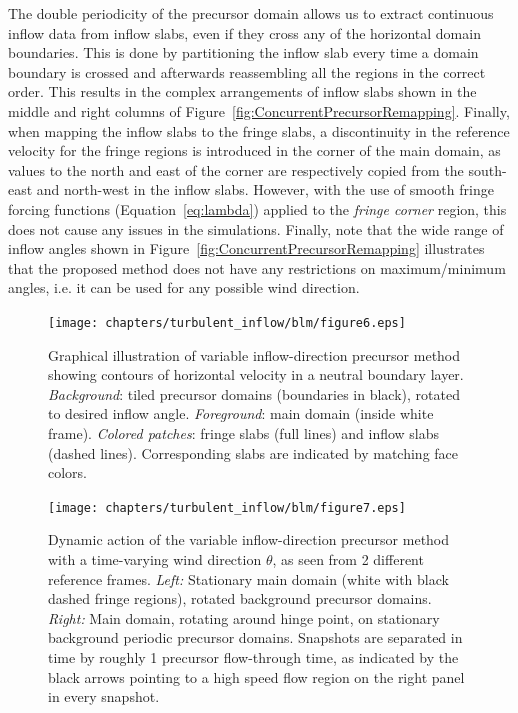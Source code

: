 	The double periodicity of the precursor domain allows us to extract continuous inflow data from inflow slabs, even if they cross any of the horizontal domain boundaries. This is done by partitioning the inflow slab every time a domain boundary is crossed and afterwards reassembling all the regions in the correct order. This results in the complex arrangements of inflow slabs shown in the middle and right columns of Figure~\ref{fig:ConcurrentPrecursorRemapping}.
	Finally, when mapping the inflow slabs to the fringe slabs, a discontinuity in the reference velocity for the fringe regions is introduced in the corner of the main domain, as values to the north and east of the corner are respectively copied from the south-east and north-west in the inflow slabs. However, with  the use of smooth fringe forcing functions (Equation~\ref{eq:lambda}) applied to the \emph{fringe corner} region, this does not cause any issues in the simulations. Finally, note that the wide range of inflow angles shown in Figure~\ref{fig:ConcurrentPrecursorRemapping} illustrates that the proposed method does not have any restrictions on maximum/minimum angles, i.e. it can be used for any possible wind direction.
	
	\begin{figure}[ht!]
		\centering
		\texttt{[image: chapters/turbulent\_inflow/blm/figure6.eps]}
		\caption[Graphical illustration of variable inflow-direction precursor method showing contours of horizontal velocity in a neutral boundary layer.]{Graphical illustration of variable inflow-direction precursor method showing contours of horizontal velocity in a neutral boundary layer. \emph{Background}: tiled precursor domains (boundaries in black), rotated to desired inflow angle. \emph{Foreground}: main domain (inside white frame). \emph{Colored patches}: fringe slabs (full lines) and inflow slabs (dashed lines). Corresponding slabs are indicated by matching face colors.}
		\label{fig:ConcurrentPrecursorField}
	\end{figure}
	\begin{figure}[h!]
		\centering
		\texttt{[image: chapters/turbulent\_inflow/blm/figure7.eps]}
		\caption[Dynamic action of the variable inflow-direction precursor method with a time-varying wind direction $\theta$, as seen from 2 different reference frames.]{Dynamic action of the variable inflow-direction precursor method with a time-varying wind direction $\theta$, as seen from 2 different reference frames. \emph{Left:} Stationary main domain (white with black dashed fringe regions), rotated background precursor domains. \emph{Right:} Main domain, rotating around hinge point, on stationary background periodic precursor domains. Snapshots are separated in time by roughly 1 precursor flow-through time, as indicated by the black arrows pointing to a high speed flow region on the right panel in every snapshot.}
		\label{fig:ConcurrentPrecursorRotating}
	\end{figure}
	

